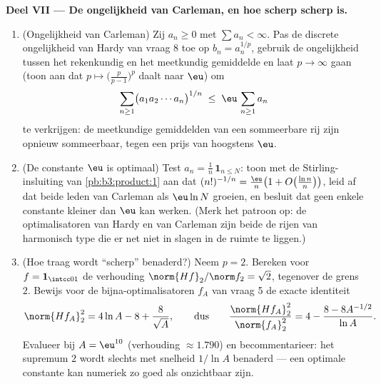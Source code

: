 \begin{problem}
\medskip
\noindent\textbf{Deel VII --- De ongelijkheid van Carleman, en
hoe scherp scherp is.}
\begin{enumerate}[resume]
  \item (Ongelijkheid van Carleman) Zij $a_n \geq 0$ met $\sum
        a_n < \infty$. Pas de discrete ongelijkheid van Hardy
        van vraag 8 toe op $b_n = a_n^{1/p}$, gebruik de
        ongelijkheid tussen het rekenkundig en het meetkundig
        gemiddelde en laat $p \to \infty$ gaan (toon aan dat $p
        \mapsto \bigl(\frac p{p-1}\bigr)^p$ daalt naar $\eu$) om
        \[
        \sum_{n\geq1}\bigl(a_1a_2\cdots a_n\bigr)^{1/n}
        \;\leq\; \eu\,\sum_{n\geq1}a_n
        \]
        te verkrijgen: de meetkundige gemiddelden van een
        sommeerbare rij zijn opnieuw sommeerbaar, tegen een prijs
        van hoogstens $\eu$.
  \item (De constante $\eu$ is optimaal) Test $a_n =
        \frac1n\,\mathbf 1_{n\leq N}$: toon met de
        Stirling-insluiting van \cref{pb:b3:product:1} aan dat
        $(n!)^{-1/n} = \frac\eu n\bigl(1 + O\bigl(\frac{\ln
        n}n\bigr)\bigr)$, leid af dat beide leden van Carleman
        als $\eu\ln N$ groeien, en besluit dat geen enkele
        constante kleiner dan $\eu$ kan werken. (Merk het
        patroon op: de optimalisatoren van Hardy en van Carleman
        zijn beide de rijen van harmonisch type die er net niet
        in slagen in de ruimte te liggen.)
  \item (Hoe traag wordt ``scherp'' benaderd?) Neem $p = 2$.
        Bereken voor $f = \mathbf 1_{\intcc01}$ de verhouding
        $\norm{Hf}_2/\norm f_2 = \sqrt2$, tegenover de grens
        $2$. Bewijs voor de bijna-optimalisatoren $f_A$ van
        vraag 5 de exacte identiteit
        \[
        \norm{Hf_A}_2^2 = 4\ln A - 8 + \frac{8}{\sqrt A},
        \qquad\text{dus}\qquad
        \frac{\norm{Hf_A}_2^2}{\norm{f_A}_2^2}
        = 4 - \frac{8 - 8A^{-1/2}}{\ln A} .
        \]
        Evalueer bij $A = \eu^{10}$ (verhouding $\approx 1.790$)
        en becommentarieer: het supremum $2$ wordt slechts met
        snelheid $1/\ln A$ benaderd --- een optimale constante
        kan numeriek zo goed als onzichtbaar zijn.
\end{enumerate}
\end{problem}
